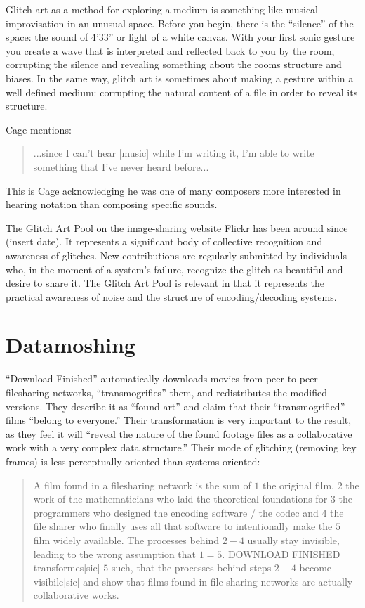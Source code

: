 \documentclass{thesis}
\begin{document}
	Glitch art as a method for exploring a medium is something like musical improvisation in an unusual space. Before you begin, there is the ``silence'' of the space: the sound of 4'33'' or light of a white canvas. With your first sonic gesture you create a wave that is interpreted and reflected back to you by the room, corrupting the silence and revealing something about the rooms structure and biases. In the same way, glitch art is sometimes about making a gesture within a well defined medium: corrupting the natural content of a file in order to reveal its structure.
	
	Cage mentions:

\begin{quote}
...since I can't hear [music] while I'm writing it, I'm able to write something that I've never heard before...
\end{quote}

	This is Cage acknowledging he was one of many composers more interested in hearing notation than composing specific sounds.

	\cite{liminalmike_flickr:glitch_????}
	The Glitch Art Pool on the image-sharing website Flickr has been around since (insert date). It represents a significant body of collective recognition and awareness of glitches. New contributions are regularly submitted by individuals who, in the moment of a system's failure, recognize the glitch as beautiful and desire to share it. The Glitch Art Pool is relevant in that it represents the practical awareness of noise and the structure of encoding/decoding systems.
	
\section{Datamoshing}
	\cite{!mediengruppe_bitnik_and_sven_knig_download_????}
	``Download Finished'' automatically downloads movies from peer to peer filesharing networks, ``transmogrifies'' them, and redistributes the modified versions. They describe it as ``found art'' and claim that their ``transmogrified'' films ``belong to everyone.'' Their transformation is very important to the result, as they feel it will ``reveal the nature of the found footage files as a collaborative work with a very complex data structure.'' Their mode of glitching (removing key frames) is less perceptually oriented than systems oriented:
	
	\begin{quote}
	A film found in a filesharing network is the sum of $1$ the original film, $2$ the work of the mathematicians who laid the theoretical foundations for $3$ the programmers who designed the encoding software / the codec and $4$ the file sharer who finally uses all that software to intentionally make the $5$ film widely available. The processes behind $2-4$ usually stay invisible, leading to the wrong assumption that $1=5$. DOWNLOAD FINISHED transformes[sic] $5$ such, that the processes behind steps $2-4$ become visibile[sic] and show that films found in file sharing networks are actually collaborative works.
	\end{quote}
	
\end{document}
